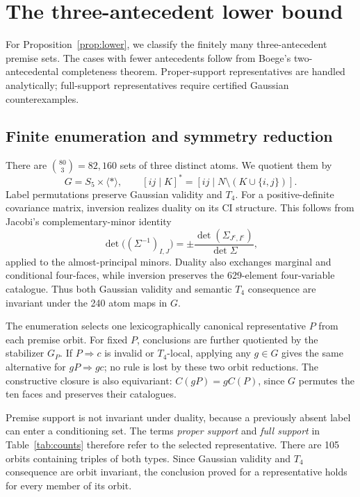 \documentclass[10pt]{article}
\theoremstyle{definition}
\newcommand{\Tfour}{T_4}
\begin{document}
\section{The three-antecedent lower bound}\label{sec:lower}

For Proposition~\ref{prop:lower}, we classify the finitely many three-antecedent premise sets.  The cases with fewer antecedents follow from Boege's two-antecedental completeness theorem.  Proper-support representatives are handled analytically; full-support representatives require certified Gaussian counterexamples.

\subsection{Finite enumeration and symmetry reduction}

There are $\binom{80}{3}=82{,}160$ sets of three distinct atoms.  We quotient them by
\[
 G=S_5\times\langle *\rangle,
 \qquad [ij\mid K]^*=[ij\mid N\setminus(K\cup\{i,j\})].
\]
Label permutations preserve Gaussian validity and $\Tfour$.  For a positive-definite covariance matrix, inversion realizes duality on its CI structure.  This follows from Jacobi's complementary-minor identity
\[
 \det\bigl((\Sigma^{-1})_{I,J}\bigr)
 =\pm\frac{\det(\Sigma_{J^c,I^c})}{\det\Sigma},
\]
applied to the almost-principal minors.  Duality also exchanges marginal and conditional four-faces, while inversion preserves the 629-element four-variable catalogue.  Thus both Gaussian validity and semantic $\Tfour$ consequence are invariant under the 240 atom maps in $G$.

The enumeration selects one lexicographically canonical representative $P$ from each premise orbit.  For fixed $P$, conclusions are further quotiented by the stabilizer $G_P$.  If $P\Rightarrow c$ is invalid or $\Tfour$-local, applying any $g\in G$ gives the same alternative for $gP\Rightarrow gc$; no rule is lost by these two orbit reductions.  The constructive closure is also equivariant: $C(gP)=gC(P)$, since $G$ permutes the ten faces and preserves their catalogues.

Premise support is not invariant under duality, because a previously absent label can enter a conditioning set.  The terms \emph{proper support} and \emph{full support} in Table~\ref{tab:counts} therefore refer to the selected representative.  There are 105 orbits containing triples of both types.  Since Gaussian validity and $\Tfour$ consequence are orbit invariant, the conclusion proved for a representative holds for every member of its orbit.
\end{document}
